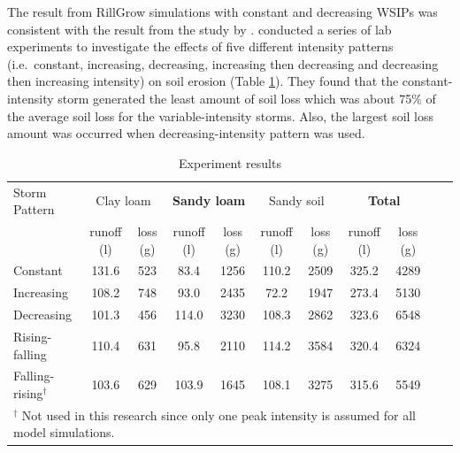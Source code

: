The result from RillGrow simulations with constant and decreasing WSIPs was
consistent with the result from the study by \citet{parsons2006-68}.
\citet{parsons2006-68} conducted a series of lab experiments to investigate the
effects of five different intensity patterns (i.e.\ constant, increasing,
decreasing, increasing then decreasing and decreasing then increasing intensity)
on soil erosion (Table \ref{tab:Tonysexperimentresults}). They found that the
constant-intensity storm generated the least amount of soil loss which was about
75\% of the average soil loss for the variable-intensity storms. Also, the
largest soil loss amount was occurred when decreasing-intensity pattern was
used.

\begin{table}[htbp]
  \caption[Experiment results]{Experiment results
\citep[From][]{parsons2006-68}}
  \label{tab:Tonysexperimentresults}
  \scriptsize
  \centering
    \begin{tabular}{lcccccccccc}
      \toprule
      Storm Pattern & \multicolumn{2}{c}{Clay loam} &
\multicolumn{2}{c}{\textbf{Sandy loam}} & \multicolumn{2}{c}{Sandy soil} &
\multicolumn{2}{c}{\textbf{Total}}\\
      \cmidrule(r){2-3} \cmidrule(rl){4-5} \cmidrule(rl){6-7}
\cmidrule(l){8-9}
      & runoff (l) & loss (g) & runoff (l) & loss (g) & runoff
(l) & loss (g) & runoff (l) & loss (g)\\
      \midrule
      Constant & 131.6 & 523 & 83.4  & 1256 & 110.2 & 2509 &
325.2 & 4289\\
      Increasing & 108.2 & 748 & 93.0  & 2435 & 72.2 & 1947 &
273.4 & 5130 \\
      Decreasing & 101.3 & 456 & 114.0 & 3230 & 108.3 & 2862 &
323.6 & 6548 \\
      Rising-falling & 110.4 & 631 & 95.8  & 2110 & 114.2 &
3584 & 320.4 & 6324\\
      Falling-rising$^\dagger$ & 103.6 & 629 & 103.9  & 1645 &
108.1 & 3275 & 315.6 & 5549\\
      \bottomrule
      \multicolumn{9}{p{11cm}}{\footnotesize $^\dagger$ Not
used in this research since only one peak intensity is assumed for all model
simulations.}\\
    \end{tabular}
\end{table}

